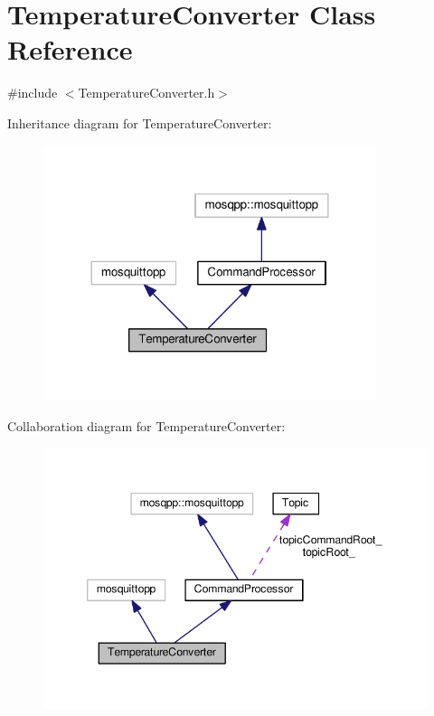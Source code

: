 \hypertarget{class_temperature_converter}{}\section{Temperature\+Converter Class Reference}
\label{class_temperature_converter}


{\ttfamily \#include $<$Temperature\+Converter.\+h$>$}



Inheritance diagram for Temperature\+Converter\+:\nopagebreak
\begin{figure}[H]
\begin{center}
\leavevmode
\includegraphics[width=276pt]{class_temperature_converter__inherit__graph}
\end{center}
\end{figure}


Collaboration diagram for Temperature\+Converter\+:\nopagebreak
\begin{figure}[H]
\begin{center}
\leavevmode
\includegraphics[width=346pt]{class_temperature_converter__coll__graph}
\end{center}
\end{figure}
